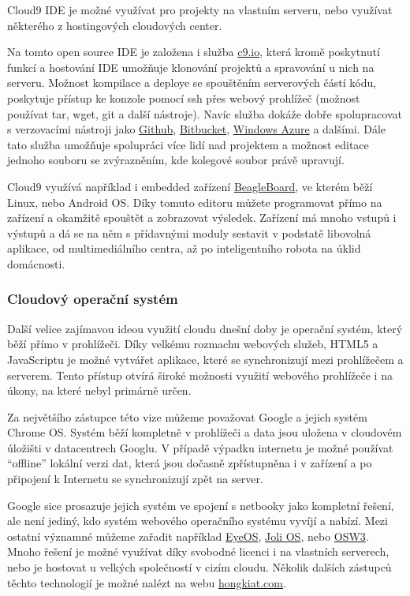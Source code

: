 Cloud9 IDE je možné využívat pro projekty na vlastním serveru, nebo využívat některého z hostingových cloudových center.

Na tomto open source IDE je založena i služba \href{https://c9.io/}{c9.io}, která kromě poskytnutí funkcí a hostování IDE umožňuje klonování projektů a spravování u nich na serveru. Možnost kompilace a deploye se spouštěním serverových částí kódu, poskytuje přístup ke konzole pomocí ssh přes webový prohlížeč (možnost používat tar, wget, git a další nástroje). Navíc služba dokáže dobře spolupracovat s verzovacími nástroji jako \href{https://github.com/}{Github}, \href{https://bitbucket.org/}{Bitbucket}, \href{http://www.windowsazure.com}{Windows Azure} a dalšími.
Dále tato služba umožňuje spolupráci více lidí nad projektem a možnost editace jednoho souboru se zvýrazněním, kde kolegové soubor právě upravují.

Cloud9 využívá například i embedded zařízení \href{http://beagleboard.org/}{BeagleBoard}, ve kterém běží Linux, nebo Android OS. Díky tomuto editoru můžete programovat přímo na zařízení a okamžitě spouštět a zobrazovat výsledek. Zařízení má mnoho vstupů i výstupů a dá se na něm s přídavnými moduly sestavit v podstatě libovolná aplikace, od multimediálního centra, až po inteligentního robota na úklid domácnosti.

\subsubsection{Cloudový operační systém}
Další velice zajímavou ideou využití cloudu dnešní doby je operační systém, který běží přímo v prohlížeči. Díky velkému rozmachu webových služeb, HTML5 a JavaScriptu je možné vytvářet aplikace, které se synchronizují mezi prohlížečem a serverem. Tento přístup otvírá široké možnosti využití webového prohlížeče i na úkony, na které nebyl primárně určen.

Za největšího zástupce této vize můžeme považovat Google a jejich systém Chrome OS. Systém běží kompletně v prohlížeči a data jsou uložena v cloudovém úložišti v datacentrech Googlu. V případě výpadku internetu je možné používat "`offline"' lokální verzi dat, která jsou dočasně zpřístupněna i v zařízení a po připojení k Internetu se synchronizují zpět na server.

Google sice prosazuje jejich systém ve spojení s netbooky jako kompletní řešení, ale není jediný, kdo systém webového operačního systému vyvíjí a nabízí. Mezi ostatní významné můžeme zařadit například \href{http://www.eyeos.com/}{EyeOS}, \href{http://www.jolicloud.com/jolios}{Joli OS}, nebo \href{https://osw3.com/}{OSW3}. Mnoho řešení je možné využívat díky svobodné licenci i na vlastních serverech, nebo je hostovat u velkých společností v cizím cloudu. Několik dalších zástupců těchto technologií je možné nalézt na webu \href{http://www.hongkiat.com/blog/free-cloud-os/}{hongkiat.com\cite{hongkiat:webos}}.

